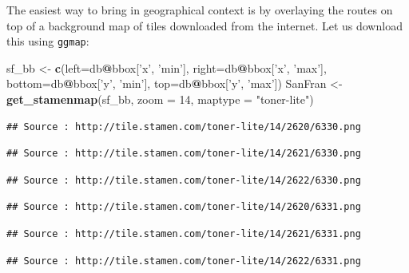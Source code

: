 \documentclass[]{book}
\newenvironment{Shaded}{\begin{snugshade}}{\end{snugshade}}
\newcommand{\DataTypeTok}[1]{\textcolor[rgb]{0.13,0.29,0.53}{#1}}
\newcommand{\DecValTok}[1]{\textcolor[rgb]{0.00,0.00,0.81}{#1}}
\newcommand{\KeywordTok}[1]{\textcolor[rgb]{0.13,0.29,0.53}{\textbf{#1}}}
\newcommand{\NormalTok}[1]{#1}
\newcommand{\OperatorTok}[1]{\textcolor[rgb]{0.81,0.36,0.00}{\textbf{#1}}}
\newcommand{\StringTok}[1]{\textcolor[rgb]{0.31,0.60,0.02}{#1}}
\begin{document}
The easiest way to bring in geographical context is by overlaying the routes on top of a background map of tiles downloaded from the internet. Let us download this using \texttt{ggmap}:

\begin{Shaded}
\begin{Highlighting}[]
\NormalTok{sf_bb <-}\StringTok{ }\KeywordTok{c}\NormalTok{(}\DataTypeTok{left=}\NormalTok{db}\OperatorTok{@}\NormalTok{bbox[}\StringTok{'x'}\NormalTok{, }\StringTok{'min'}\NormalTok{],}
           \DataTypeTok{right=}\NormalTok{db}\OperatorTok{@}\NormalTok{bbox[}\StringTok{'x'}\NormalTok{, }\StringTok{'max'}\NormalTok{],}
           \DataTypeTok{bottom=}\NormalTok{db}\OperatorTok{@}\NormalTok{bbox[}\StringTok{'y'}\NormalTok{, }\StringTok{'min'}\NormalTok{],}
           \DataTypeTok{top=}\NormalTok{db}\OperatorTok{@}\NormalTok{bbox[}\StringTok{'y'}\NormalTok{, }\StringTok{'max'}\NormalTok{])}
\NormalTok{SanFran <-}\StringTok{ }\KeywordTok{get_stamenmap}\NormalTok{(sf_bb, }
                         \DataTypeTok{zoom =} \DecValTok{14}\NormalTok{, }
                         \DataTypeTok{maptype =} \StringTok{"toner-lite"}\NormalTok{)}
\end{Highlighting}
\end{Shaded}

\begin{verbatim}
## Source : http://tile.stamen.com/toner-lite/14/2620/6330.png
\end{verbatim}

\begin{verbatim}
## Source : http://tile.stamen.com/toner-lite/14/2621/6330.png
\end{verbatim}

\begin{verbatim}
## Source : http://tile.stamen.com/toner-lite/14/2622/6330.png
\end{verbatim}

\begin{verbatim}
## Source : http://tile.stamen.com/toner-lite/14/2620/6331.png
\end{verbatim}

\begin{verbatim}
## Source : http://tile.stamen.com/toner-lite/14/2621/6331.png
\end{verbatim}

\begin{verbatim}
## Source : http://tile.stamen.com/toner-lite/14/2622/6331.png
\end{verbatim}
\end{document}
